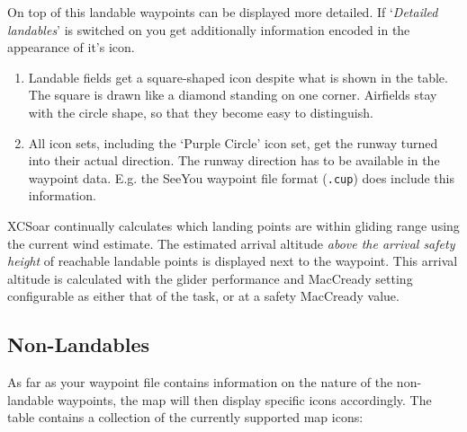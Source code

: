 On top of this landable waypoints can be displayed more detailed. If 
`{\it Detailed landables}' is switched on you get additionally information 
encoded in the appearance of it's icon. 
\begin{enumerate}
\item  Landable fields get a square-shaped icon despite what is shown in the table.
  The square is drawn like a diamond standing on one corner. Airfields stay with the 
  circle shape, so that they become easy to distinguish.
\item  All icon sets, including the `Purple Circle' icon set, get the 
  runway turned into their actual direction. The runway direction has to be available in 
  the waypoint data. E.g. the SeeYou waypoint file format (\verb|.cup|) does 
  include this information.  
\end{enumerate}

XCSoar continually calculates which landing points are within gliding
range using the current wind estimate.  The estimated arrival altitude
{\em above the arrival safety height} of reachable landable points is
displayed next to the waypoint.  This arrival altitude is calculated
with the glider performance and MacCready setting configurable as
either that of the task, or at a safety MacCready value.

\subsection*{Non-Landables}
As far as your waypoint file contains information on the nature of the 
non-landable waypoints, the map will then display specific icons accordingly. 
The table contains a collection of the currently supported map icons:

